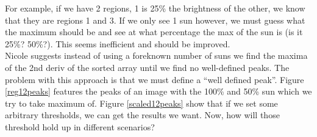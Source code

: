\documentclass[10pt]{scrartcl}
\begin{document}
For example, if we have 2 regions, 1 is 25\% the brightness of the other, we know that they are regions 1 and 3. If we only see 1 sun however, we must guess what the maximum should be and see at what percentage the max of the sun is (is it 25\%? 50\%?). This seems inefficient and should be improved. \\

Nicole suggests instead of using a foreknown number of suns we find the maxima of the 2nd deriv of the sorted array until we find no well-defined peaks. The problem with this approach is that we must define a ``well defined peak''. Figure \ref{reg12peaks} features the peaks of an image with the 100\% and 50\% sun which we try to take maximum of. Figure \ref{scaled12peaks} show that if we set some arbitrary thresholds, we can get the results we want. Now, how will those threshold hold up in different scenarios?
\end{document}
